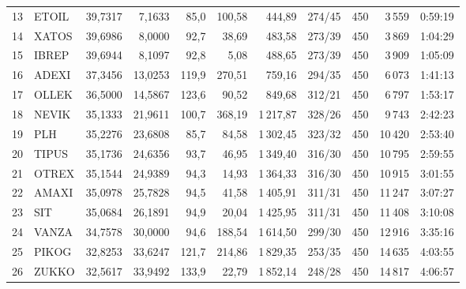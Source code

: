 \begin{longtable}{rlrrrrrrrrr}
13 & ETOIL & 39,7317 & 7,1633 & 85,0 & 100,58 & 444,89 & 274/45 & 450 & 3\,559 & 0:59:19\\
14 & XATOS & 39,6986 & 8,0000 & 92,7 & 38,69 & 483,58 & 273/39 & 450 & 3\,869 & 1:04:29\\
15 & IBREP & 39,6944 & 8,1097 & 92,8 & 5,08 & 488,65 & 273/39 & 450 & 3\,909 & 1:05:09\\
16 & ADEXI & 37,3456 & 13,0253 & 119,9 & 270,51 & 759,16 & 294/35 & 450 & 6\,073 & 1:41:13\\
17 & OLLEK & 36,5000 & 14,5867 & 123,6 & 90,52 & 849,68 & 312/21 & 450 & 6\,797 & 1:53:17\\
18 & NEVIK & 35,1333 & 21,9611 & 100,7 & 368,19 & 1\,217,87 & 328/26 & 450 & 9\,743 & 2:42:23\\
19 & PLH & 35,2276 & 23,6808 & 85,7 & 84,58 & 1\,302,45 & 323/32 & 450 & 10\,420 & 2:53:40\\
20 & TIPUS & 35,1736 & 24,6356 & 93,7 & 46,95 & 1\,349,40 & 316/30 & 450 & 10\,795 & 2:59:55\\
21 & OTREX & 35,1544 & 24,9389 & 94,3 & 14,93 & 1\,364,33 & 316/30 & 450 & 10\,915 & 3:01:55\\
22 & AMAXI & 35,0978 & 25,7828 & 94,5 & 41,58 & 1\,405,91 & 311/31 & 450 & 11\,247 & 3:07:27\\
23 & SIT & 35,0684 & 26,1891 & 94,9 & 20,04 & 1\,425,95 & 311/31 & 450 & 11\,408 & 3:10:08\\
24 & VANZA & 34,7578 & 30,0000 & 94,6 & 188,54 & 1\,614,50 & 299/30 & 450 & 12\,916 & 3:35:16\\
25 & PIKOG & 32,8253 & 33,6247 & 121,7 & 214,86 & 1\,829,35 & 253/35 & 450 & 14\,635 & 4:03:55\\
26 & ZUKKO & 32,5617 & 33,9492 & 133,9 & 22,79 & 1\,852,14 & 248/28 & 450 & 14\,817 & 4:06:57\\
\end{longtable}
\endgroup
